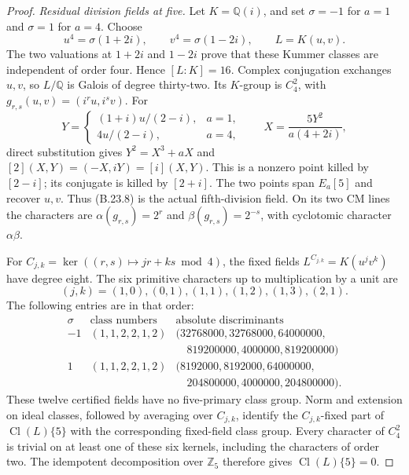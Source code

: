 \begin{proof}
\emph{Residual division fields at five.}
Let $K=\mathbb Q(i)$, and set $\sigma=-1$ for $a=1$ and
$\sigma=1$ for $a=4$. Choose
\[
 u^4=\sigma(1+2i),\qquad v^4=\sigma(1-2i),\qquad L=K(u,v).
                                                               \tag{B.23.8}
\]
The two valuations at $1+2i$ and $1-2i$ prove that these
Kummer classes are independent of order four. Hence
$[L:K]=16$. Complex conjugation exchanges $u,v$, so $L/\mathbb Q$
is Galois of degree thirty-two. Its $K$-group is
$C_4^2$, with $g_{r,s}(u,v)=(i^ru,i^sv)$.
For
\[
 Y=\begin{cases}(1+i)u/(2-i),&a=1,\\4u/(2-i),&a=4,\end{cases}
 \qquad X=\frac{5Y^2}{a(4+2i)},
                                                               \tag{B.23.9}
\]
direct substitution gives $Y^2=X^3+aX$ and
$[2](X,Y)=(-X,iY)=[i](X,Y)$.
This is a nonzero point killed by $[2-i]$; its conjugate is
killed by $[2+i]$. The two points span $E_a[5]$ and recover
$u,v$. Thus (B.23.8) is the actual fifth-division field.
On its two CM lines the characters are
$\alpha(g_{r,s})=2^r$ and $\beta(g_{r,s})=2^{-s}$, with
cyclotomic character $\alpha\beta$.

For $C_{j,k}=\ker((r,s)\mapsto jr+ks\bmod4)$, the fixed
fields $L^{C_{j,k}}=K(u^jv^k)$ have degree eight. The six
primitive characters up to multiplication by a unit are
\[
 (j,k)=(1,0),(0,1),(1,1),(1,2),(1,3),(2,1).
\]
The following entries are in that order:
\[
 \begin{array}{c|c|c}
 \sigma&\text{class numbers}&\text{absolute discriminants}\\ \hline
 -1&(1,1,2,2,1,2)&
 (32768000,32768000,64000000,\\
 &&\quad819200000,4000000,819200000)\\
 1&(1,1,2,2,1,2)&
 (8192000,8192000,64000000,\\
 &&\quad204800000,4000000,204800000).
 \end{array}                                                    \tag{B.23.10}
\]
These twelve certified fields have no five-primary class group.
Norm and extension on ideal classes, followed by averaging over
$C_{j,k}$, identify the $C_{j,k}$-fixed part of
$\operatorname{Cl}(L)\{5\}$ with the corresponding fixed-field
class group. Every character of $C_4^2$ is trivial on at least
one of these six kernels, including the characters of order two.
The idempotent decomposition over $\mathbb Z_5$ therefore gives
$\operatorname{Cl}(L)\{5\}=0$.


\end{proof}

